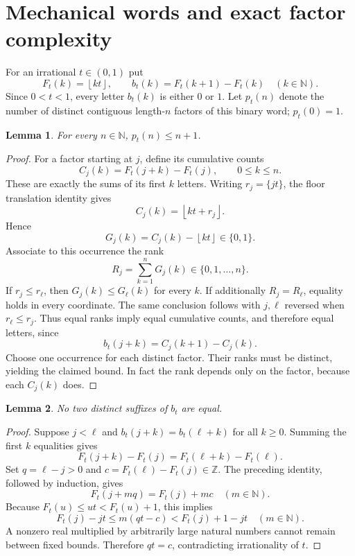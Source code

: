 \documentclass[11pt]{article}
\newtheorem{lemma}{Lemma}
\newcommand{\N}{\mathbb N}
\newcommand{\Z}{\mathbb Z}
\newcommand{\floor}[1]{\left\lfloor #1\right\rfloor}
\begin{document}
\section{Mechanical words and exact factor complexity}
For an irrational $t\in(0,1)$ put
\[
 F_t(k)=\floor{kt},\qquad b_t(k)=F_t(k+1)-F_t(k)\quad(k\in\N).
\]
Since $0<t<1$, every letter $b_t(k)$ is either $0$ or $1$. Let $p_t(n)$ denote the number of distinct contiguous length-$n$ factors of this binary word; $p_t(0)=1$.

\begin{lemma}\label{upper}
For every $n\in\N$, $p_t(n)\leq n+1$.
\end{lemma}
\begin{proof}
For a factor starting at $j$, define its cumulative counts
\[
 C_j(k)=F_t(j+k)-F_t(j),\qquad 0\leq k\leq n.
\]
These are exactly the sums of its first $k$ letters. Writing $r_j=\{jt\}$, the floor translation identity gives
\[
 C_j(k)=\floor{kt+r_j}.
\]
Hence
\[
 G_j(k)=C_j(k)-\floor{kt}\in\{0,1\}.
\]
Associate to this occurrence the rank
\[
 R_j=\sum_{k=1}^n G_j(k)\in\{0,1,\ldots,n\}.
\]
If $r_j\leq r_\ell$, then $G_j(k)\leq G_\ell(k)$ for every $k$. If additionally $R_j=R_\ell$, equality holds in every coordinate. The same conclusion follows with $j,\ell$ reversed when $r_\ell\leq r_j$. Thus equal ranks imply equal cumulative counts, and therefore equal letters, since
\[
 b_t(j+k)=C_j(k+1)-C_j(k).
\]
Choose one occurrence for each distinct factor. Their ranks must be distinct, yielding the claimed bound. In fact the rank depends only on the factor, because each $C_j(k)$ does.
\end{proof}

\begin{lemma}\label{aperiodic}
No two distinct suffixes of $b_t$ are equal.
\end{lemma}
\begin{proof}
Suppose $j<\ell$ and $b_t(j+k)=b_t(\ell+k)$ for all $k\geq0$. Summing the first $k$ equalities gives
\[
 F_t(j+k)-F_t(j)=F_t(\ell+k)-F_t(\ell).
\]
Set $q=\ell-j>0$ and $c=F_t(\ell)-F_t(j)\in\Z$. The preceding identity, followed by induction, gives
\[
 F_t(j+mq)=F_t(j)+mc\quad(m\in\N).
\]
Because $F_t(u)\leq ut<F_t(u)+1$, this implies
\[
 F_t(j)-jt\leq m(qt-c)<F_t(j)+1-jt
 \quad(m\in\N).
\]
A nonzero real multiplied by arbitrarily large natural numbers cannot remain between fixed bounds. Therefore $qt=c$, contradicting irrationality of $t$.
\end{proof}
\end{document}
